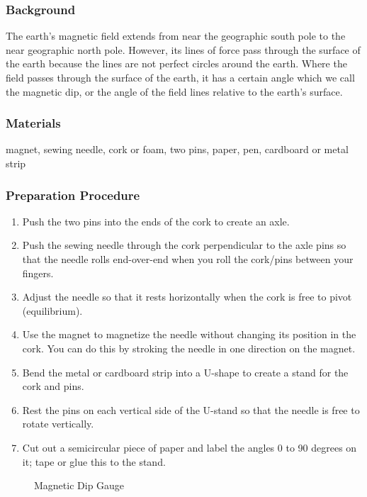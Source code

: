 \subsubsection*{Background}
The earth's magnetic field extends from near the geographic south pole to the near geographic north pole.  However, its lines of force pass through the surface of the earth because the lines are not perfect circles around the earth.  Where the field passes through the surface of the earth, it has a certain angle which we call the magnetic dip, or the angle of the field lines relative to the earth's surface.

\subsubsection*{Materials}
magnet, sewing needle, cork or foam, two pins, paper, pen, cardboard or metal strip

\subsubsection*{Preparation Procedure}
\begin{enumerate}
\item{Push the two pins into the ends of the cork to create an axle.}
\item{Push the sewing needle through the cork perpendicular to the axle pins so that the needle rolls end-over-end when you roll the cork/pins between your fingers.}
\item{Adjust the needle so that it rests horizontally when the cork is free to pivot (equilibrium).}
\item{Use the magnet to magnetize the needle without changing its position in the cork.  You can do this by stroking the needle in one direction on the magnet.}
\item{Bend the metal or cardboard strip into a U-shape to create a stand for the cork and pins.}
\item{Rest the pins on each vertical side of the U-stand so that the needle is free to rotate vertically.}
\item{Cut out a semicircular piece of paper and label the angles 0 to 90 degrees on it; tape or glue this to the stand.}
\end{enumerate}

\begin{figure}
\begin{center}
\def\svgwidth{150pt}

\caption{Magnetic Dip Gauge}
\label{fig:magnetic-dip-gauge}
\end{center}
\end{figure}

